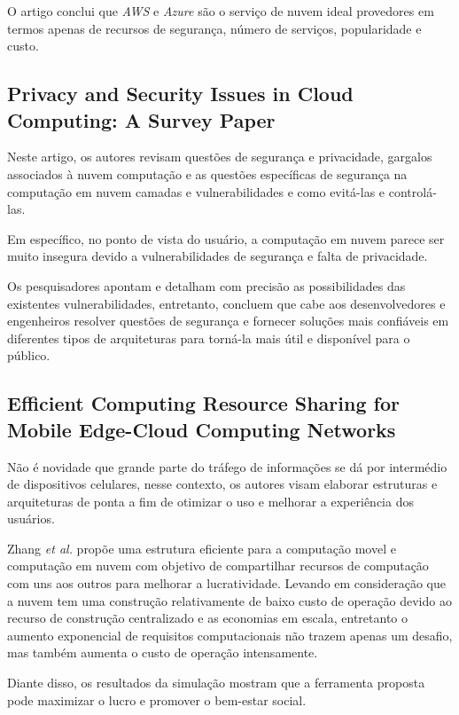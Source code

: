 \documentclass[12pt]{article}
\begin{document}
O artigo conclui que \emph{AWS} e \emph{Azure} são o serviço de nuvem ideal provedores em termos apenas de recursos de segurança, número de serviços, popularidade e custo.

\subsection{Privacy and Security Issues in Cloud Computing: A Survey Paper\cite{bamasoud}}

Neste artigo, os autores revisam questões de segurança e privacidade, gargalos associados à nuvem computação e as questões específicas de segurança na computação em nuvem camadas e vulnerabilidades e como evitá-las e controlá-las.

Em específico, no ponto de vista do usuário, a computação em nuvem parece ser muito insegura devido a vulnerabilidades de segurança e falta de privacidade. 

Os pesquisadores apontam e detalham com precisão as possibilidades das existentes vulnerabilidades, entretanto, concluem que cabe aos desenvolvedores e engenheiros resolver questões de segurança e fornecer soluções mais confiáveis em diferentes tipos de arquiteturas para torná-la mais útil e disponível para o público.

\subsection{Efficient Computing Resource Sharing for Mobile Edge-Cloud Computing Networks\cite{zhang}}

Não é novidade que grande parte do tráfego de informações se dá por intermédio de dispositivos celulares, nesse contexto, os autores visam elaborar estruturas e arquiteturas de ponta a fim de otimizar o uso e melhorar a experiência dos usuários.

Zhang \emph{et al.} propõe uma estrutura eficiente para a computação movel e computação em nuvem com objetivo de compartilhar recursos de computação com uns aos outros para melhorar a lucratividade. Levando em consideração que a nuvem tem uma construção relativamente de baixo custo de operação devido ao recurso de construção centralizado e as economias em escala, entretanto o aumento exponencial de requisitos computacionais não trazem apenas um desafio, mas também aumenta o custo de operação intensamente.

Diante disso, os resultados da simulação mostram que a ferramenta proposta pode maximizar o lucro e promover o bem-estar social.
\end{document}
